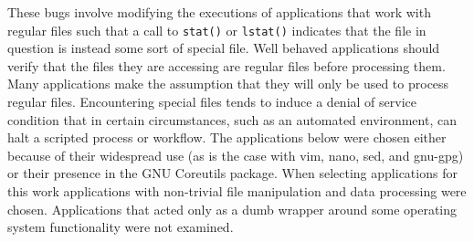         These bugs involve modifying the executions of applications that work with regular files such that a call to
        {\tt stat()} or {\tt lstat()} indicates that the file in question is instead some sort of special file.  Well
        behaved applications should verify that the files they are accessing are regular files before processing them.
        Many applications make the assumption that they will only be used to process regular files.  Encountering
        special files tends to induce a denial of service condition that in certain circumstances, such as an automated
        environment, can halt a scripted process or workflow.  The applications below were chosen either because of
        their widespread use (as is the case with vim, nano, sed, and gnu-gpg) or their presence in the GNU Coreutils
        package.  When selecting applications for this work applications with non-trivial file manipulation and data
        processing were chosen.  Applications that acted only as a dumb wrapper around some operating system
        functionality were not examined.

